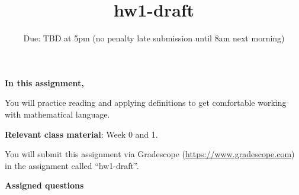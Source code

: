 

\title{hw1-draft}
\date{Due: TBD at 5pm (no penalty late submission until 8am next morning)}

\maketitle
\thispagestyle{fancy}


{\bf In this assignment,}

You will practice reading and
applying definitions to get comfortable working with mathematical language.

{\bf Relevant class material}: Week 0 and 1.

You will submit this assignment via Gradescope
(\href{https://www.gradescope.com}{https://www.gradescope.com}) 
in the assignment called ``hw1-draft''.

\instructions


{\bf Assigned questions}

